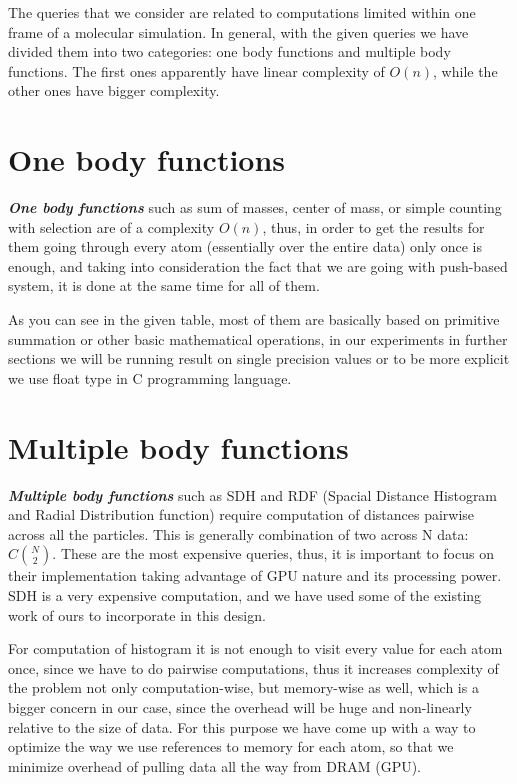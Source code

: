 \documentclass[12pt,letterpaper]{report}
\begin{document}
The queries that we consider are related to computations limited within one frame of a molecular simulation. In general, with the given queries we have divided them into two categories: one body functions and multiple body functions. The first ones apparently have linear complexity of $O(n)$, while the other ones have bigger complexity. 

\section{One body functions}
\hspace{3em} \emph{\textbf{One body functions}} such as sum of masses, center of mass, or simple counting with selection  are of a complexity $O(n)$, thus, in order to get the results for them going through every atom (essentially over the entire data) only once is enough, and taking into consideration the fact that we are going with push-based system, it is done at the same time for all of them.

As you can see in the given table, most of them are basically based on primitive summation or other basic mathematical operations, in our experiments in further sections we will be running result on single precision values or to be more explicit we use float type in C programming language.

\section{Multiple body functions}
\emph{\textbf{Multiple body functions}} such as SDH and RDF (Spacial Distance Histogram and Radial Distribution function) require computation of distances pairwise across all the particles. This is generally combination of two across N data: 	$C\binom{N}{2}$. These are the most expensive queries, thus, it is important to focus on their implementation taking advantage of GPU nature and its processing power. SDH is a very expensive computation, and we have used some of the existing work of ours\cite{sdhgpu} to incorporate in this design.

For computation of histogram it is not enough to visit every value for each atom once, since we have to do pairwise computations, thus it increases complexity of the problem not only computation-wise, but memory-wise as well, which is a bigger concern in our case, since the overhead will be huge and non-linearly relative to the size of data. For this purpose we have come up with a way to optimize the way we use references to memory for each atom, so that we minimize overhead of pulling data all the way from DRAM (GPU).
\end{document}
